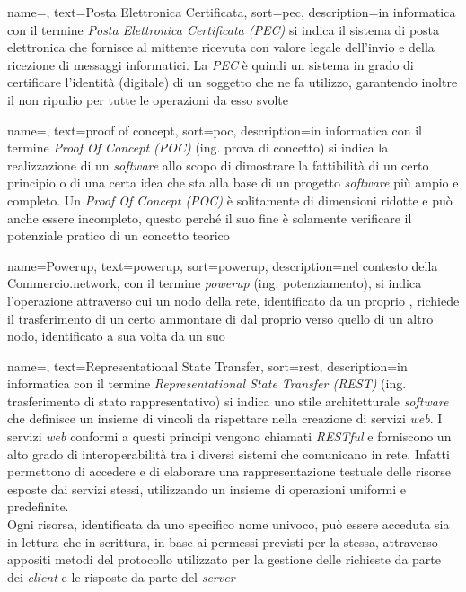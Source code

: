 {
	name=,
	text=Posta Elettronica Certificata,
	sort=pec,
	description={in informatica con il termine \emph{Posta Elettronica Certificata (PEC)} si indica il sistema di posta elettronica che fornisce al mittente ricevuta con valore legale dell’invio e della ricezione di messaggi informatici. La \textit{PEC} è quindi un sistema in grado di certificare l'identità (digitale) di un soggetto che ne fa utilizzo, garantendo inoltre il non ripudio per tutte le operazioni da esso svolte}
}

{
	name=,
	text=proof of concept,
	sort=poc,
	description={in informatica con il termine \emph{Proof Of Concept (POC)} (ing. prova di concetto) si indica la realizzazione di un \textit{software} allo scopo di dimostrare la fattibilità di un certo principio o di una certa idea che sta alla base di un progetto \textit{software} più ampio e completo. Un \emph{Proof Of Concept (POC)} è solitamente di dimensioni ridotte e può anche essere incompleto, questo perché il suo fine è solamente verificare il potenziale pratico di un concetto teorico}
}

{
	name=Powerup,
	text=powerup,
	sort=powerup,
	description={nel contesto della Commercio.network, con il termine \emph{powerup} (ing. potenziamento), si indica l'operazione attraverso cui un nodo della rete, identificato da un proprio , richiede il trasferimento di un certo ammontare di  dal proprio  verso quello di un altro nodo, identificato a sua volta da un suo }
}

{
	name=,
	text=Representational State Transfer,
	sort=rest,
	description={in informatica con il termine \emph{Representational State Transfer (REST)} (ing. trasferimento di stato rappresentativo) si indica uno stile architetturale \textit{software} che definisce un insieme di vincoli da rispettare nella creazione di servizi \textit{web}. I servizi \textit{web} conformi a questi principi vengono chiamati \textit{RESTful} e forniscono un alto grado di interoperabilità tra i diversi sistemi che comunicano in rete. Infatti permettono di accedere e di elaborare una rappresentazione testuale delle risorse esposte dai servizi stessi, utilizzando un insieme di operazioni uniformi e predefinite.\\
	Ogni risorsa, identificata da uno specifico nome univoco, può essere acceduta sia in lettura che in scrittura, in base ai permessi previsti per la stessa, attraverso appositi metodi del protocollo utilizzato per la gestione delle richieste da parte dei \textit{client} e le risposte da parte del \textit{server}}
}

